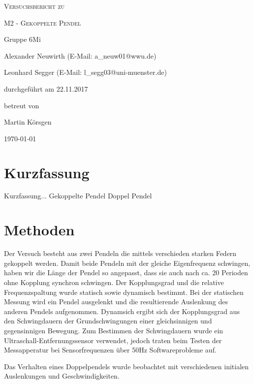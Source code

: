 \documentclass[
	a4paper,
	12pt,
	pagesize,
	ngerman
]{scrartcl}
\begin{document}
	
	\begin{titlepage}
		\centering
		{\scshape\LARGE Versuchsbericht zu \par}
		\vspace{1cm}
		{\scshape\huge M2 - Gekoppelte Pendel\par}
		\vspace{2.5cm}
		{\LARGE Gruppe 6Mi \par}
		\vspace{0.5cm}
		
		{\large Alexander Neuwirth (E-Mail: a\_neuw01@wwu.de) \par}
		{\large Leonhard Segger (E-Mail: l\_segg03@uni-muenster.de) \par}
		\vfill
		
		durchgeführt am 22.11.2017\par
		betreut von\par
		{\large Martin Körsgen}
		
		\vfill
		
		{\large \today\par}
	\end{titlepage}
	\tableofcontents
	\newpage
	
	\section{Kurzfassung}
	Kurzfassung...
	Gekoppelte Pendel
	Doppel Pendel

	\section{Methoden}
	Der Versuch besteht aus zwei Pendeln die mittels verschieden starken Federn gekoppelt werden. Damit beide Pendeln mit der gleiche Eigenfrequenz schwingen, haben wir die Länge der Pendel so angepasst, dass sie auch nach ca. 20 Perioden ohne Kopplung synchron schwingen. Der Kopplungsgrad und die relative Frequenzspaltung wurde statisch sowie dynamisch bestimmt. Bei der statischen Messung wird ein Pendel ausgelenkt und die resultierende Auslenkung des anderen Pendels aufgenommen. Dynamsich ergibt sich der Kopplungsgrad aus den Schwingdauern der Grundschwingungen einer gleichsinnigen und gegensinnigen Bewegung.
	Zum Bestimmen der Schwingdauern wurde ein Ultraschall-Entfernungssensor verwendet, jedoch traten beim Testen der Messapperatur bei Sensorfrequenzen über 50Hz Softwareprobleme auf.

	\noindent{}Das Verhalten eines Doppelpendels wurde beobachtet mit verschiedenen initialen Auslenkungen und Geschwindigkeiten. 
	
\end{document}
